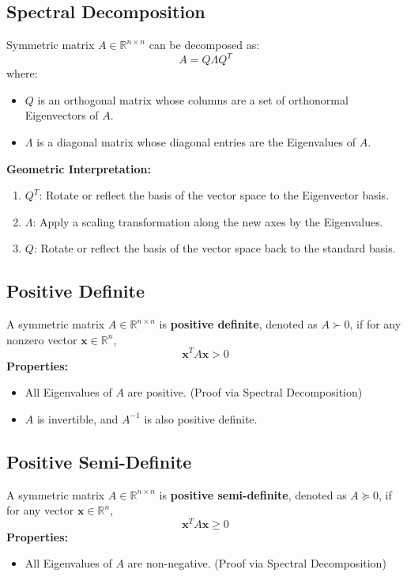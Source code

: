 \documentclass{article}
\begin{document}
\subsection{Spectral Decomposition}

Symmetric matrix $A \in \mathbb{R}^{n \times n}$ can be decomposed as:
\[
    A = Q \Lambda Q^T
\]
where:
\begin{itemize}
    \item $Q$ is an orthogonal matrix whose columns are a set of orthonormal Eigenvectors of $A$.
    \item $\Lambda$ is a diagonal matrix whose diagonal entries are the Eigenvalues of $A$.
\end{itemize}
\textbf{Geometric Interpretation:}
\begin{enumerate}
    \item $Q^T$: Rotate or reflect the basis of the vector space to the Eigenvector basis.
    \item $\Lambda$: Apply a scaling transformation along the new axes by the Eigenvalues.
    \item $Q$: Rotate or reflect the basis of the vector space back to the standard basis.
\end{enumerate}

\subsection{Positive Definite}
A symmetric matrix $A \in \mathbb{R}^{n \times n}$ is \textbf{positive definite}, denoted as $A \succ 0$, if for any nonzero vector $\mathbf{x} \in \mathbb{R}^n$,
\[
    \mathbf{x}^T A \mathbf{x} > 0
\]
\textbf{Properties:}
\begin{itemize}
    \item All Eigenvalues of $A$ are positive. (Proof via Spectral Decomposition)
    \item $A$ is invertible, and $A^{-1}$ is also positive definite.
\end{itemize}

\subsection{Positive Semi-Definite}
A symmetric matrix $A \in \mathbb{R}^{n \times n}$ is \textbf{positive semi-definite}, denoted as $A \succeq 0$, if for any vector $\mathbf{x} \in \mathbb{R}^n$,
\[
    \mathbf{x}^T A \mathbf{x} \geq 0
\]
\textbf{Properties:}
\begin{itemize}
    \item All Eigenvalues of $A$ are non-negative. (Proof via Spectral Decomposition)
\end{itemize}
\end{document}
